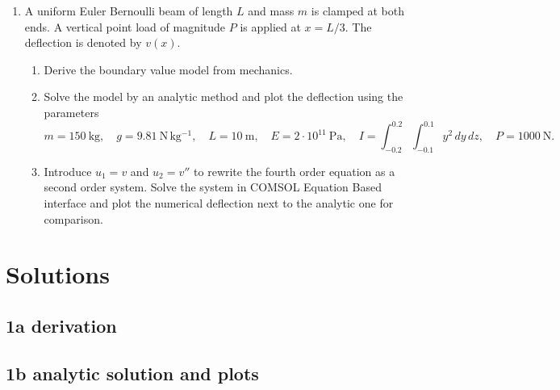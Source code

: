 \documentclass[12pt, a4paper]{article}
\begin{document}
\begin{enumerate}[leftmargin=1.2em,label=\arabic*.]
  \item A uniform Euler Bernoulli beam of length $L$ and mass $m$ is clamped at both ends.
  A vertical point load of magnitude $P$ is applied at $x=L/3$.
  The deflection is denoted by $v(x)$.
  \begin{enumerate}[label=\alph*)]
    \item Derive the boundary value model from mechanics.
    \item Solve the model by an analytic method and plot the deflection using the parameters
          \[
          m=150~\mathrm{kg},\quad g=9.81~\mathrm{N\,kg^{-1}},\quad L=10~\mathrm{m},\quad
          E=2\cdot 10^{11}~\mathrm{Pa},\quad
          I=\int_{-0.2}^{0.2}\!\int_{-0.1}^{0.1} y^{2}\,dy\,dz,\quad
          P=1000~\mathrm{N}.
          \]
    \item Introduce $u_{1}=v$ and $u_{2}=v''$ to rewrite the fourth order equation as a second order system.
          Solve the system in COMSOL Equation Based interface and plot the numerical deflection next to the analytic one for comparison.
  \end{enumerate}
\end{enumerate}

\newpage
\section*{Solutions}

\subsection*{1a  derivation}


\subsection*{1b  analytic solution and plots}
\end{document}

